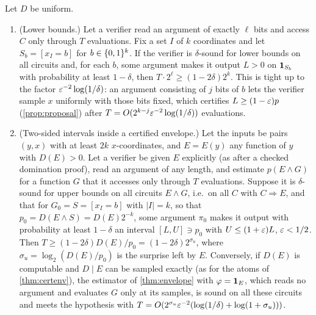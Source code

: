 \begin{theorem}\label{thm:surprise}
Let $D$ be uniform.
\begin{enumerate}[label=(\alph*)]
\item (Lower bounds.) Let a verifier read an argument of exactly $\ell$ bits and
access $C$ only through $T$ evaluations. Fix a set $I$ of $k$ coordinates and let
$S_b=[x_I=b]$ for $b\in\{0,1\}^k$. If the verifier is $\delta$-sound for lower
bounds on all circuits and, for each $b$, some argument makes it output $L>0$
on $\mathbf{1}_{S_b}$ with probability at least $1-\delta$, then $T\cdot2^\ell\ge(1-2\delta)2^k$.
This is tight up to the factor $\varepsilon^{-2}\log(1/\delta)$: an argument consisting of $j$
bits of $b$ lets the verifier sample $x$ uniformly with those bits fixed, which
certifies $L\ge(1-\varepsilon)p$ (\cref{prop:proposal}) after
$T=O(2^{k-j}\varepsilon^{-2}\log(1/\delta))$ evaluations.
\item (Two-sided intervals inside a certified envelope.) Let the inputs be pairs
$(y,x)$ with at least $2k$ $x$-coordinates, and $E=E(y)$ any function of $y$ with
$D(E)>0$. Let a verifier be given $E$ explicitly (as after a checked domination
proof), read an argument of any length, and estimate $p(E\wedge G)$ for a function $G$
that it accesses only through $T$ evaluations. Suppose it is $\delta$-sound for upper
bounds on all circuits $E\wedge G$, i.e.\ on all $C$ with $C\Rightarrow E$, and that
for $G_0=S=[x_I=b]$ with $|I|=k$, so that $p_0=D(E\wedge S)=D(E)2^{-k}$, some argument
$\pi_0$ makes it output with probability at least $1-\delta$ an interval $[L,U]\ni
p_0$ with $U\le(1+\varepsilon)L$, $\varepsilon<1/2$. Then
$T\ge(1-2\delta)D(E)/p_0=(1-2\delta)2^{\sigma_u}$, where $\sigma_u=\log_2(D(E)/p_0)$
is the surprise left by $E$. Conversely, if $D(E)$ is computable and $D\mid E$ can be
sampled exactly (as for the atoms of \cref{thm:certenv}), the estimator of
\cref{thm:envelope} with $\varphi=\mathbf{1}_E$, which reads no argument and evaluates $G$
only at its samples, is sound on all these circuits and meets the hypothesis with
$T=O(2^{\sigma_u}\varepsilon^{-2}(\log(1/\delta)+\log(1+\sigma_u)))$.
\end{enumerate}
\end{theorem}

